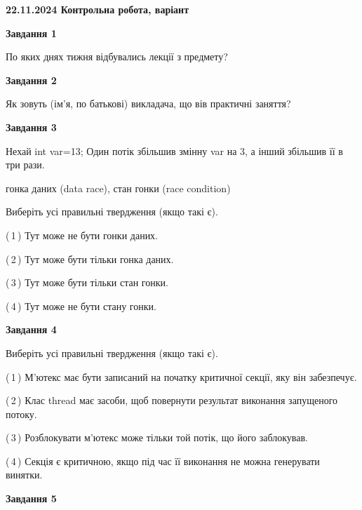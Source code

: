 \documentclass[12pt, ukrainian]{article}
\begin{document}
\begin {large}

\textbf{22.11.2024 Контрольна робота, варіант  }\par


{

\begin{center}
\textbf{Завдання 1}
\end{center}

По яких днях тижня відбувались лекції з предмету?


\begin{center}
\textbf{Завдання 2}
\end{center}

Як зовуть (ім'я, по батькові) викладача, що вів практичні заняття?


\begin{center}
\textbf{Завдання 3}
\end{center}

Нехай int var=13; Один потік збільшив змінну var на 3, а інший збільшив її в три рази.

гонка даних (data race), стан гонки (race condition)

Виберіть усі правильні твердження (якщо такі є).\par
\vspace{2mm}
(\,1\,) Тут може не бути гонки даних.%

(\,2\,) Тут може бути тільки гонка даних.%

(\,3\,) Тут може бути тільки стан гонки.%

(\,4\,) Тут може не бути стану гонки.%


\begin{center}
\textbf{Завдання 4}
\end{center}

Виберіть усі правильні твердження (якщо такі є).\par
\vspace{2mm}

(\,1\,) М’ютекс має бути записаний на початку критичної секції, яку він забезпечує.%

(\,2\,) Клас thread має засоби, щоб повернути результат виконання запущеного потоку.%

(\,3\,) Розблокувати м’ютекс може тільки той потік, що його заблокував.%

(\,4\,) Секція є критичною, якщо під час її виконання не можна генерувати винятки.%


\begin{center}
\textbf{Завдання 5}
\end{center}

}
\end{large}
\end{document}
